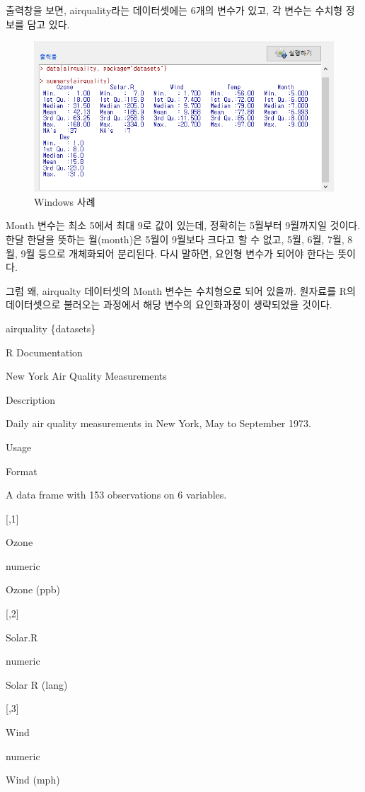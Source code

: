 \documentclass[
]{book}
\begin{document}
출력창을 보면, airquality라는 데이터셋에는 6개의 변수가 있고, 각 변수는 수치형 정보를 담고 있다.

\begin{figure}
\centering
\includegraphics{fig/dataset-airquality-03.png}
\caption{Windows 사례}
\end{figure}

Month 변수는 최소 5에서 최대 9로 값이 있는데, 정확히는 5월부터 9월까지일 것이다. 한달 한달을 뜻하는 월(month)은 5월이 9월보다 크다고 할 수 없고, 5월, 6월, 7월, 8월, 9월 등으로 개체화되어 분리된다. 다시 말하면, 요인형 변수가 되어야 한다는 뜻이다.

그럼 왜, airqualty 데이터셋의 Month 변수는 수치형으로 되어 있을까. 원자료를 R의 데이터셋으로 불러오는 과정에서 해당 변수의 요인화과정이 생략되었을 것이다.

airquality \{datasets\}

R Documentation

New York Air Quality Measurements

Description

Daily air quality measurements in New York, May to September 1973.

Usage

Format

A data frame with 153 observations on 6 variables.

{[},1{]}

Ozone

numeric

Ozone (ppb)

{[},2{]}

Solar.R

numeric

Solar R (lang)

{[},3{]}

Wind

numeric

Wind (mph)
\end{document}
